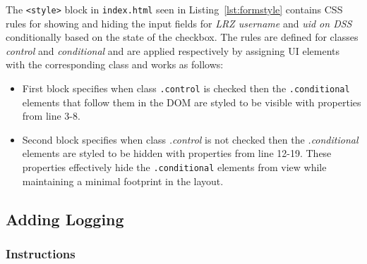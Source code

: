 

The \texttt{<style>} block in \texttt{index.html} seen in
Listing~\ref{lst:formstyle} contains CSS rules for showing and hiding the input
fields for \textit{LRZ username} and \textit{uid on DSS} conditionally based on
the state of the checkbox. The rules are defined for classes \textit{control}
and \textit{conditional} and are applied respectively by assigning UI elements
with the corresponding class and works as follows:

\begin{itemize}
    \item First block specifies when class \texttt{.control} is checked then the
    \texttt{.conditional} elements that follow them in the DOM are styled to be
    visible with properties from line 3-8. 
    \item Second block specifies when class \textit{.control} is not checked
    then the \textit{.conditional} elements are styled to be hidden with
    properties from line 12-19. These properties effectively hide the
    \texttt{.conditional} elements from view while maintaining a minimal
    footprint in the
    layout.
\end{itemize}



% 

% 

\subsection{Adding Logging}

\subsubsection*{Instructions}

